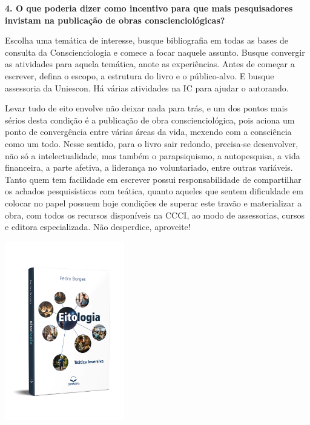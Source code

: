 \documentclass{gescons}
\begin{document}
\begin{multicols}{2}
\textbf{4.       O que poderia dizer como incentivo para que mais pesquisadores invistam na publicação de obras conscienciológicas?}

Escolha uma temática de interesse, busque bibliografia em todas as bases de consulta da Conscienciologia e comece a focar naquele assunto. Busque convergir as atividades para aquela temática, anote as experiências. Antes de começar a escrever, defina o escopo, a estrutura do livro e o público-alvo. E busque assessoria da Uniescon. Há várias atividades na IC para ajudar o autorando. 
    
Levar tudo de eito envolve não deixar nada para trás, e um dos pontos mais sérios desta condição é a publicação de obra conscienciológica, pois aciona um ponto de convergência entre várias áreas da vida, mexendo com a consciência como um todo. Nesse sentido, para o livro sair redondo, precisa-se desenvolver, não só a intelectualidade, mas também o parapsiquismo, a autopesquisa, a vida financeira, a parte afetiva, a liderança no voluntariado, entre outras variáveis. Tanto quem tem facilidade em escrever possui responsabilidade de compartilhar os achados pesquisísticos com teática, quanto aqueles que sentem dificuldade em colocar no papel possuem hoje condições de superar este travão e materializar a obra, com todos os recursos disponíveis na CCCI, ao modo de assessorias, cursos e editora especializada. Não desperdice, aproveite!

\begin{center}
    \vspace{-0.5cm}
    \includegraphics[width=5.2cm]{articles/entrevista/mockups/Pedro_Borges.png}
\end{center}

    \end{multicols}
\end{document}
